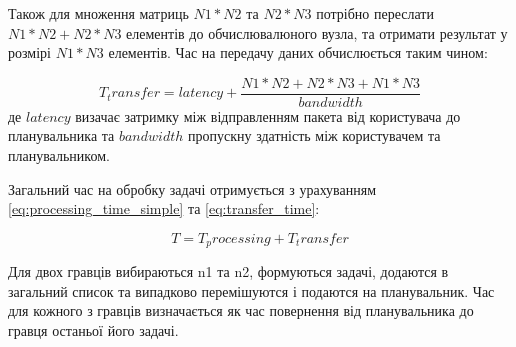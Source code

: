 Також для множення матриць $N1*N2$ та $N2*N3$ потрібно переслати $N1*N2 + N2*N3$ елементів до обчислювалюного вузла, та отримати результат у розмірі $N1*N3$ елементів. Час на передачу даних обчислюється таким чином:

\begin{equation}
\label{eq:transfer_time}
T_transfer = latency + \frac{N1*N2+N2*N3+N1*N3}{bandwidth}
\end{equation}
де $latency$ визачає затримку між відправленням пакета від користувача до планувальника та $bandwidth$ пропускну здатність між користувачем та планувальником.

Загальний час на обробку задачі отримується з урахуванням \ref{eq:processing_time_simple} та \ref{eq:transfer_time}:

\begin{equation}
\label{eq:total_task_processing_time}
T = T_processing + T_transfer
\end{equation}

Для двох гравців вибираються n1 та n2, формуються задачі, додаются в загальний список та випадково перемішуются і подаются на планувальник. Час для кожного з гравців визначається як час повернення від планувальника до гравця останьої його задачі.